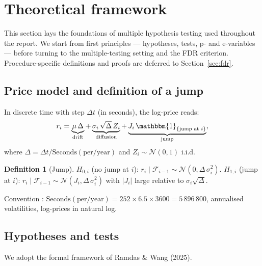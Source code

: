 \documentclass[11pt,a4paper]{article}
\theoremstyle{plain}
\theoremstyle{definition}
\newtheorem{definition}[theorem]{Definition}
\theoremstyle{remark}
\newcommand{\ind}{\mathbbm{1}}
\newcommand{\dt}{\Delta}
\begin{document}
\section{Theoretical framework}
\label{sec:theory}

This section lays the foundations of multiple hypothesis testing used
throughout the report. We start from first principles --- hypotheses, tests,
p- and e-variables --- before turning to the multiple-testing setting and the
FDR criterion. Procedure-specific definitions and proofs are deferred to
Section~\ref{sec:fdr}.

\subsection{Price model and definition of a jump}

In discrete time with step $\dt t$ (in seconds), the log-price reads:
\begin{equation}\label{eq:discrete}
  r_i = \underbrace{\mu\,\dt}_{\text{drift}}
      + \underbrace{\sigma_i\,\sqrt{\dt}\,Z_i}_{\text{diffusion}}
      + \underbrace{J_i\,\ind_{\{\text{jump at }i\}}}_{\text{jump}},
\end{equation}
where $\dt = \dt t / \mathrm{Seconds(per / year)}$ and $Z_i \sim \mathcal{N}(0,1)$
i.i.d.

\begin{definition}[Jump]
$H_{0,i}$ (no jump at $i$): $r_i \mid \mathcal{F}_{i-1} \sim \mathcal{N}(0, \dt\,\sigma_i^2)$.
$H_{1,i}$ (jump at $i$): $r_i \mid \mathcal{F}_{i-1} \sim \mathcal{N}(J_i, \dt\,\sigma_i^2)$
with $|J_i|$ large relative to $\sigma_i\sqrt{\dt}$.
\end{definition}

Convention : $\mathrm{Seconds(per / year)} = 252 \times 6.5 \times 3600 = 5\,896\,800$,
annualised volatilities, log-prices in natural log.

\subsection{Hypotheses and tests}

We adopt the formal framework of Ramdas \& Wang (2025).
\end{document}
